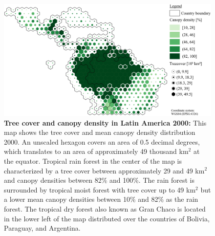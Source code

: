 			\begin{figure}[ht]
				\centering
				\includegraphics[scale=.85]{img/americas_treecover_frameless}
				\caption[Tree cover and canopy density in Latin America at 2000]{\textbf{Tree cover and canopy density in Latin America 2000:} This map shows the tree cover and mean canopy density distribution 2000. An unscaled hexagon covers an area of 0.5 decimal degrees, which translates to an area of approximately 49 thousand km$^2$ at the equator. Tropical rain forest in the center of the map is characterized by a tree cover between approximately 29 and 49 km$^2$ and canopy densities between 82\% and 100\%. The rain forest is surrounded by tropical moist forest with tree cover up to 49 km$^2$ but a lower mean canopy densities between 10\% and 82\% as the rain forest. The tropical dry forest also known as Gran Chaco is located in the lower left of the map distributed over the countries of Bolivia, Paraguay, and Argentina.}
				\label{fig:americas_tree_cover}
			\end{figure}


